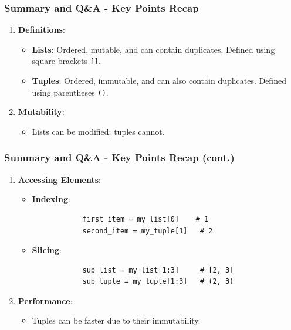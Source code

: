 \documentclass{beamer}
\begin{document}
\begin{frame}[fragile]
    \frametitle{Summary and Q\&A - Key Points Recap}
    \begin{enumerate}
        \item \textbf{Definitions}:
        \begin{itemize}
            \item \textbf{Lists}: Ordered, mutable, and can contain duplicates. Defined using square brackets \texttt{[]}.
            \item \textbf{Tuples}: Ordered, immutable, and can also contain duplicates. Defined using parentheses \texttt{()}.
        \end{itemize}
        \item \textbf{Mutability}:
        \begin{itemize}
            \item Lists can be modified; tuples cannot.
        \end{itemize}
    \end{enumerate}
\end{frame}

\begin{frame}[fragile]
    \frametitle{Summary and Q\&A - Key Points Recap (cont.)}
    \begin{enumerate}[resume]
        \item \textbf{Accessing Elements}:
        \begin{itemize}
            \item \textbf{Indexing}:
            \begin{lstlisting}
            first_item = my_list[0]    # 1
            second_item = my_tuple[1]   # 2
            \end{lstlisting}
            \item \textbf{Slicing}:
            \begin{lstlisting}
            sub_list = my_list[1:3]     # [2, 3]
            sub_tuple = my_tuple[1:3]   # (2, 3)
            \end{lstlisting}
        \end{itemize}
        \item \textbf{Performance}:
        \begin{itemize}
            \item Tuples can be faster due to their immutability.
        \end{itemize}
    \end{enumerate}
\end{frame}
\end{document}
